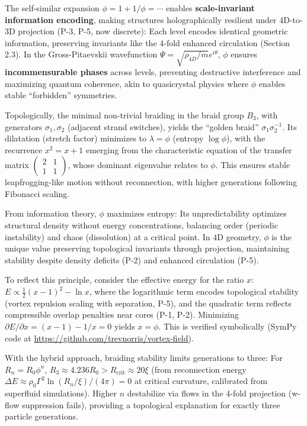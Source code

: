 The self-similar expansion $\phi = 1 + 1/\phi = \cdots$ enables \textbf{scale-invariant information encoding}, making structures holographically resilient under 4D-to-3D projection (P-3, P-5, now discrete): Each level encodes identical geometric information, preserving invariants like the 4-fold enhanced circulation (Section 2.3). In the Gross-Pitaevskii wavefunction $\Psi = \sqrt{\rho_{4D}/m} e^{i \theta}$, $\phi$ ensures \textbf{incommensurable phases} across levels, preventing destructive interference and maximizing quantum coherence, akin to quasicrystal physics where $\phi$ enables stable ``forbidden'' symmetries.

Topologically, the minimal non-trivial braiding in the braid group $B_3$, with generators $\sigma_1, \sigma_2$ (adjacent strand switches), yields the ``golden braid'' $\sigma_1 \sigma_2^{-1}$. Its dilatation (stretch factor) minimizes to $\lambda = \phi$ (entropy $\log \phi$), with the recurrence $x^2 = x + 1$ emerging from the characteristic equation of the transfer matrix $\begin{pmatrix} 2 & 1 \\ 1 & 1 \end{pmatrix}$, whose dominant eigenvalue relates to $\phi$. This ensures stable leapfrogging-like motion without reconnection, with higher generations following Fibonacci scaling.

From information theory, $\phi$ maximizes entropy: Its unpredictability optimizes structural density without energy concentrations, balancing order (periodic instability) and chaos (dissolution) at a critical point. In 4D geometry, $\phi$ is the unique value preserving topological invariants through projection, maintaining stability despite density deficits (P-2) and enhanced circulation (P-5).

To reflect this principle, consider the effective energy for the ratio $x$: $E \propto \frac{1}{2} (x - 1)^2 - \ln x$, where the logarithmic term encodes topological stability (vortex repulsion scaling with separation, P-5), and the quadratic term reflects compressible overlap penalties near cores (P-1, P-2). Minimizing $\partial E / \partial x = (x - 1) - 1/x = 0$ yields $x = \phi$. This is verified symbolically (SymPy code at \url{https://github.com/trevnorris/vortex-field}).

With the hybrid approach, braiding stability limits generations to three: For $R_n = R_0 \phi^n$, $R_3 \approx 4.236 R_0 > R_{\text{crit}} \approx 20 \xi$ (from reconnection energy $\Delta E \approx \rho_0 \Gamma^2 \ln(R_n / \xi) / (4\pi) = 0$ at critical curvature, calibrated from superfluid simulations). Higher $n$ destabilize via flows in the 4-fold projection (w-flow suppression fails), providing a topological explanation for exactly three particle generations.

